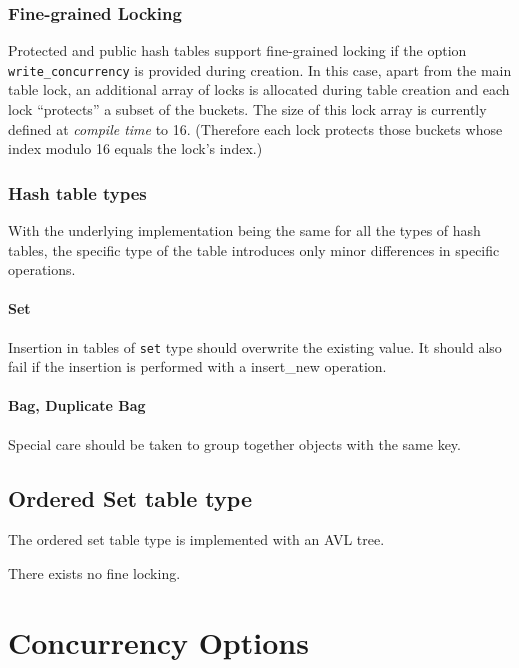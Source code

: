 \documentclass[aps,pre,preprint,nofootinbib]{revtex4}
\begin{document}
\subsubsection{Fine-grained Locking}

Protected and public hash tables support fine-grained locking if the option \verb|write_concurrency| is provided during creation.
In this case, apart from the main table lock, an additional array of locks is allocated during table creation and each lock ``protects'' a subset of the buckets.
The size of this lock array is currently defined at \emph{compile time} to 16.
(Therefore each lock protects those buckets whose index modulo 16 equals the lock's index.)


\subsubsection{Hash table types}     %

With the underlying implementation being the same for all the types of hash tables, the specific type of the table introduces only minor differences in specific operations.

\paragraph{Set}

Insertion in tables of \verb|set| type should overwrite the existing value.
It should also fail if the insertion is performed with a insert\_new operation.

\paragraph{Bag, Duplicate Bag}

Special care should be taken to group together objects with the same key.

\subsection{Ordered Set table type}

The ordered set table type is implemented with an AVL tree.

There exists no fine locking.

\section{Concurrency Options} \label{sec:concurrency_options}
\end{document}

